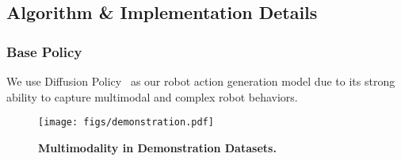 \subsection{Algorithm \& Implementation Details}

\subsubsection{Base Policy} \hfill 

\label{sec:appendix_base_policy} We use Diffusion Policy~\cite{chi2024diffusionpolicy} as our robot action generation model due to its strong ability to capture multimodal and complex robot behaviors.
 
 \begin{figure}[ht]
     \centering
     \texttt{[image: figs/demonstration.pdf]}
     \caption{\textbf{Multimodality in Demonstration Datasets.}}
     \label{fig:demonstration_rollout}
 \end{figure}


